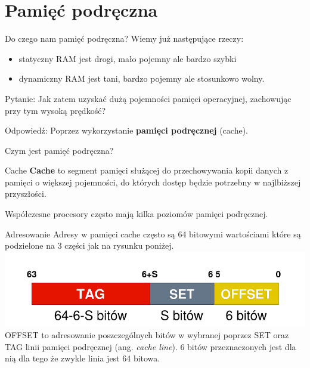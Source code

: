 \documentclass{beamer}
\begin{document}
\section{Pamięć podręczna}
\begin{frame}{Do czego nam pamięć podręczna?}
Wiemy już następujące rzeczy:
\begin{itemize}
	\item statyczny RAM jest drogi, mało pojemny ale bardzo szybki
	\item dynamiczny RAM jest tani, bardzo pojemny ale stosunkowo wolny.
\end{itemize}
\pause
\begin{block}{Pytanie:}
Jak zatem uzyskać dużą pojemności pamięci operacyjnej, zachowując przy tym wysoką prędkość?
\end{block}
\pause
\begin{exampleblock}{Odpowiedź:}
Poprzez wykorzystanie \textbf{pamięci podręcznej} (cache).
\end{exampleblock}

\end{frame}
\begin{frame}{Czym jest pamięć podręczna?}
\begin{block}{Cache}
\textbf{Cache} to segment pamięci służącej do przechowywania kopii danych z pamięci o większej pojemności, do których dostęp będzie potrzebny w najlbiższej przyszłości.
\end{block}

Współczesne procesory często mają kilka poziomów pamięci podręcznej.
\end{frame}

\begin{frame}{Adresowanie}
Adresy w pamięci cache często są 64 bitowymi wartościami które są podzielone na 3 części jak na rysunku poniżej.
\includegraphics[scale=0.75]{assets/cache_address.pdf}
OFFSET to adresowanie poszczególnych bitów w wybranej poprzez SET oraz TAG linii pamięci podręcznej (ang. \emph{cache line}). 6 bitów przeznaczonych jest dla nią dla tego że zwykle linia jest 64 bitowa.

\end{frame}
\end{document}
